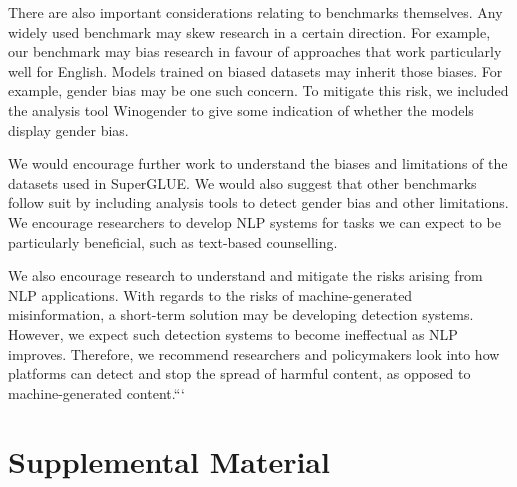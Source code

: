 \documentclass{report}
\begin{document}
There are also important considerations relating to benchmarks themselves. Any widely used benchmark may skew research in a certain direction. For example, our benchmark may bias research in favour of approaches that work particularly well for English. Models trained on biased datasets may inherit those biases. For example, gender bias may be one such concern. To mitigate this risk, we included the analysis tool Winogender to give some indication of whether the models display gender bias.

We would encourage further work to understand the biases and limitations of the datasets used in SuperGLUE. We would also suggest that other benchmarks follow suit by including analysis tools to detect gender bias and other limitations. We encourage researchers to develop NLP systems for tasks we can expect to be particularly beneficial, such as text-based counselling.

We also encourage research to understand and mitigate the risks arising from NLP applications. With regards to the risks of machine-generated misinformation, a short-term solution may be developing detection systems. However, we expect such detection systems to become ineffectual as NLP improves. Therefore, we recommend researchers and policymakers look into how platforms can detect and stop the spread of harmful content, as opposed to machine-generated content.```





\chapter*{Supplemental Material}
\end{document}
